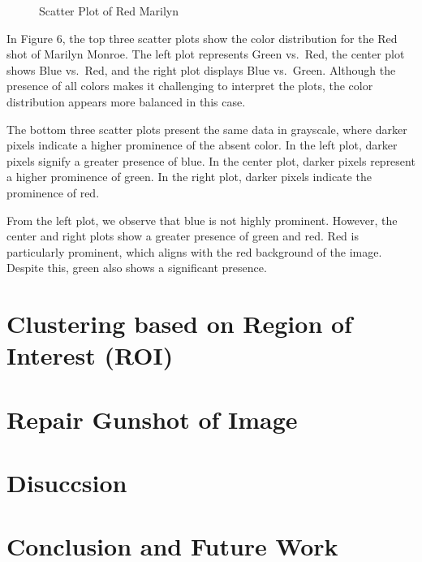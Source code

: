 \documentclass{article}
\begin{document}
\begin{figure}[ht]
  \caption{Scatter Plot of Red Marilyn}
  \label{fig:orange_marilyn_scatter}
\end{figure}

In Figure 6, the top three scatter plots show the color distribution for
the Red shot of Marilyn Monroe. The left plot represents Green vs.~Red,
the center plot shows Blue vs.~Red, and the right plot displays Blue
vs.~Green. Although the presence of all colors makes it challenging to
interpret the plots, the color distribution appears more balanced in
this case.

The bottom three scatter plots present the same data in grayscale, where
darker pixels indicate a higher prominence of the absent color. In the
left plot, darker pixels signify a greater presence of blue. In the
center plot, darker pixels represent a higher prominence of green. In
the right plot, darker pixels indicate the prominence of red.

From the left plot, we observe that blue is not highly prominent.
However, the center and right plots show a greater presence of green and
red. Red is particularly prominent, which aligns with the red background
of the image. Despite this, green also shows a significant presence.

\hypertarget{clustering-based-on-region-of-interest-roi}{%
\section{Clustering based on Region of Interest
(ROI)}\label{clustering-based-on-region-of-interest-roi}}

\hypertarget{repair-gunshot-of-image}{%
\section{Repair Gunshot of Image}\label{repair-gunshot-of-image}}

\hypertarget{disuccsion}{%
\section{Disuccsion}\label{disuccsion}}

\hypertarget{conclusion-and-future-work}{%
\section{Conclusion and Future Work}\label{conclusion-and-future-work}}



\end{document}
